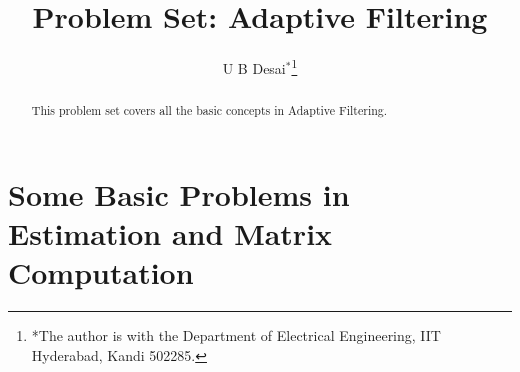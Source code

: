 \documentclass[journal,12pt,twocolumn]{IEEEtran}
\begin{document}
\providecommand{\nCr}[2]{\,^{#1}C_{#2}} %
\providecommand{\nPr}[2]{\,^{#1}P_{#2}} %
\providecommand{\mbf}{\mathbf}
\providecommand{\pr}[1]{\ensuremath{\Pr\left(#1\right)}}
\providecommand{\qfunc}[1]{\ensuremath{Q\left(#1\right)}}
\providecommand{\sbrak}[1]{\ensuremath{{}\left[#1\right]}}
\providecommand{\lsbrak}[1]{\ensuremath{{}\left[#1\right.}}
\providecommand{\rsbrak}[1]{\ensuremath{{}\left.#1\right]}}
\providecommand{\brak}[1]{\ensuremath{\left(#1\right)}}
\providecommand{\lbrak}[1]{\ensuremath{\left(#1\right.}}
\providecommand{\rbrak}[1]{\ensuremath{\left.#1\right)}}
\providecommand{\cbrak}[1]{\ensuremath{\left\{#1\right\}}}
\providecommand{\lcbrak}[1]{\ensuremath{\left\{#1\right.}}
\providecommand{\rcbrak}[1]{\ensuremath{\left.#1\right\}}}
\newcommand{\sgn}{\mathop{\mathrm{sgn}}}
\providecommand{\abs}[1]{\left\vert#1\right\vert}
\providecommand{\res}[1]{\Res\displaylimits_{#1}} 
\providecommand{\norm}[1]{\lVert#1\rVert}
\providecommand{\mtx}[1]{\mathbf{#1}}
\providecommand{\mean}[1]{E\left[ #1 \right]}
\providecommand{\fourier}{\overset{\mathcal{F}}{ \rightleftharpoons}}
\providecommand{\system}{\overset{\mathcal{H}}{ \longleftrightarrow}}


\newcommand{\solution}{\noindent \textbf{Solution: }}
\providecommand{\dec}[2]{\ensuremath{\overset{#1}{\underset{#2}{\gtrless}}}}
\newcommand\myeq{\mathrel{\stackrel{\makebox[0pt]{\mbox{\normalfont\tiny def}}}{=}}}




\title{ 
Problem Set: Adaptive Filtering
}
\author{U B Desai$^{*}$\thanks{*The author is with the Department of Electrical Engineering, IIT Hyderabad, Kandi 502285.}}
\maketitle

\begin{abstract}
This problem set covers all the
basic concepts in Adaptive Filtering.
\end{abstract}


\section{Some Basic Problems in Estimation and Matrix Computation}
\end{document}
